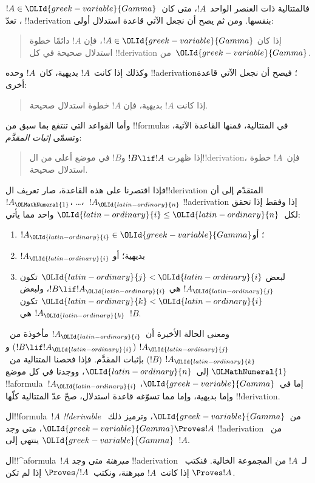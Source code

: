 \documentclass[../../../include/open-logic-section]{subfiles}
\begin{document}
فالمتتالية ذات العنصر الواحد~$!A$، متى كان~$!A \in {\OLId{greek-variable}{Gamma}}$،
تعدّ !!a{derivation} بنفسها. ومن ثم يصح أن نجعل الآتي
قاعدة استدلال أولى:
\begin{quote}
  إذا كان $!A \in {\OLId{greek-variable}{Gamma}}$، فإن $!A$ دائمًا خطوة استدلال صحيحة في كل
  !!{derivation} من~${\OLId{greek-variable}{Gamma}}$.
\end{quote}
وكذلك إذا كانت~$!A$ بديهية، كان~$!A$ وحده !!a{derivation}؛
فيصح أن نجعل الآتي قاعدة أخرى:
\begin{quote}
  إذا كانت $!A$ بديهية، فإن $!A$ خطوة استدلال صحيحة.
\end{quote}
وأما القواعد التي تنتفع بما سبق من !!{formula}s في المتتالية،
فمنها القاعدة الآتية، وتسمّى \emph{إثبات المقدَّم}:
\begin{quote}
  إذا ظهرت $!B \lif !A$ و$!B$ في موضع أعلى من ال!!{derivation}،
  فإن~$!A$ خطوة استدلال صحيحة.
\end{quote}
فإذا اقتصرنا على هذه القاعدة، صار تعريف ال!!{derivation}
المتقدّم إلى أن~$!A_{\OLMathNumeral{1}}$، \dots،~$!A_{\OLId{latin-ordinary}{n}}$ !!a{derivation}
إذا وفقط إذا تحقق لكل~${\OLId{latin-ordinary}{i}} \le {\OLId{latin-ordinary}{n}}$ واحد مما يأتي:
\begin{enumerate}
\item $!A_{\OLId{latin-ordinary}{i}} \in {\OLId{greek-variable}{Gamma}}$؛ أو
\item $!A_{\OLId{latin-ordinary}{i}}$ بديهية؛ أو
\item لبعض ${\OLId{latin-ordinary}{j}} < {\OLId{latin-ordinary}{i}}$ تكون $!A_{\OLId{latin-ordinary}{j}}$ هي $!B \lif !A_{\OLId{latin-ordinary}{i}}$، ولبعض ${\OLId{latin-ordinary}{k}} < {\OLId{latin-ordinary}{i}}$ تكون
  $!A_{\OLId{latin-ordinary}{k}}$ هي~$!B$.
\end{enumerate}
ومعنى الحالة الأخيرة أن~$!A_{\OLId{latin-ordinary}{i}}$ مأخوذة من~$!A_{\OLId{latin-ordinary}{j}}$
($!B \lif !A_{\OLId{latin-ordinary}{i}}$) و$!A_{\OLId{latin-ordinary}{k}}$ ($!B$) بإثبات المقدَّم.
فإذا فحصنا المتتالية من~${\OLMathNumeral{1}}$ إلى~${\OLId{latin-ordinary}{n}}$، ووجدنا في كل موضع
!!a{formula}~$!A_{\OLId{latin-ordinary}{i}}$ إما في~${\OLId{greek-variable}{Gamma}}$، وإما بديهية، وإما مما
تسوّغه قاعدة استدلال، صحّ عدّ المتتالية كلّها !!{derivation}.


\begin{defn}[!!^{derivability}]
ال!!{formula}~$!A$ \emph{!!{derivable}} من~${\OLId{greek-variable}{Gamma}}$،
وترميز ذلك~${\OLId{greek-variable}{Gamma}} \Proves !A$، متى وجد !!a{derivation}
من~${\OLId{greek-variable}{Gamma}}$ ينتهي إلى~$!A$.
\end{defn}

\begin{defn}[المبرهنات]
ال!!^a{formula}~$!A$ \emph{مبرهنة} متى وجد !!a{derivation}
لـ~$!A$ من المجموعة الخالية. فنكتب~$\Proves !A$ إذا كانت~$!A$
مبرهنة، ونكتب~$\Proves/ !A$ إذا لم تكن.
\end{defn}
\end{document}
